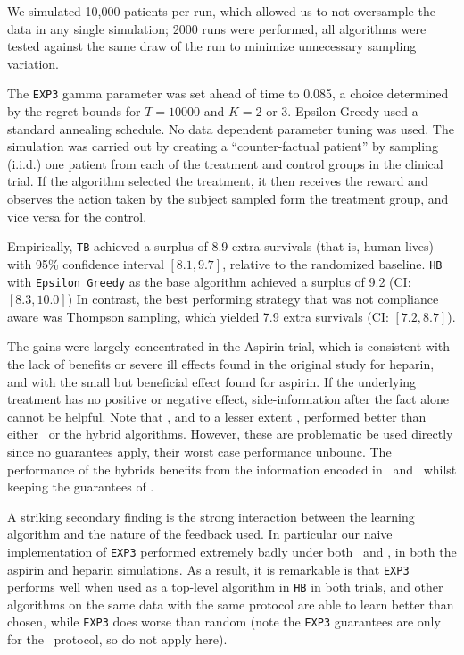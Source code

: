 We simulated 10,000 patients per run, which allowed us to not oversample the data in any single simulation; 2000 runs were performed, all algorithms were tested against the same draw of the run to minimize unnecessary sampling variation. 

The \texttt{EXP3} gamma parameter was set ahead of time to 0.085, a choice determined by the regret-bounds for $T=10000$ and $K=2$ or $3$. Epsilon-Greedy used a standard annealing schedule. No data dependent parameter tuning was used.
The simulation was carried out by creating a ``counter-factual patient'' by sampling (i.i.d.) one patient from each of the treatment and control groups in the clinical trial. If the algorithm selected the treatment, it then receives the reward and observes the action taken by the subject sampled form the treatment group, and vice versa for the control.


Empirically, \texttt{TB} achieved a surplus of 8.9 extra survivals (that is, human lives) with 95\% confidence interval $[8.1,9.7]$, relative to the randomized baseline.
\texttt{HB} with \texttt{Epsilon Greedy} as the base algorithm achieved a surplus of 9.2 (CI: $[8.3,10.0]$)
In contrast, the best performing strategy that was not compliance aware was Thompson sampling, which yielded 7.9 extra survivals (CI: $[7.2,8.7]$). 

The gains were largely concentrated in the Aspirin trial, which is consistent with the lack of benefits or severe ill effects found in the original study \cite{ist:97} for heparin, and with the small but beneficial effect found for aspirin. 
If the underlying treatment has no positive or negative effect, side-information after the fact alone cannot be helpful.
Note that \actual, and to a lesser extent \comply, performed better than either \chosen\, or the hybrid algorithms. However, these are problematic be used directly since no guarantees apply, their worst case performance unbounc. The performance of the hybrids benefits from the information encoded in \actual\, and \comply\, whilst keeping the guarantees of \chosen. 


A striking secondary finding is the strong interaction between the learning algorithm and the nature of the feedback used. In particular our naive implementation of \texttt{EXP3} performed extremely badly under both \actual\, and \comply, in both the aspirin and heparin simulations. As a result, it is remarkable is that \texttt{EXP3} performs well when used as a top-level algorithm in \texttt{HB} in both trials, and other algorithms on the same data with the same protocol are able to learn better than chosen, while \texttt{EXP3} does worse than random (note the \texttt{EXP3} guarantees are only for the \chosen\, protocol, so do not apply here).



